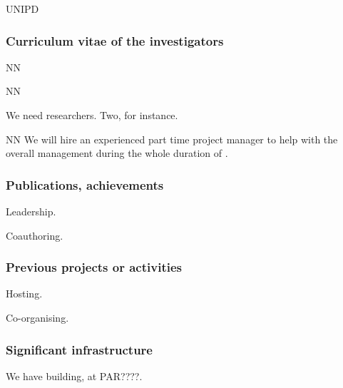 \begin{sitedescription}{UNIPD}
\subsubsection*{Curriculum vitae of the investigators}




\begin{participant}[type=res,PM=48,salary=2500]{NN}
\end{participant}
\begin{participant}[type=res,PM=36,salary=2500]{NN}

We need researchers. Two, for instance.

\end{participant}

\begin{participant}[type=res,PM=24,salary=3932]{NN}
  We will hire an experienced part time project manager to help with
  the overall management during the whole duration of \TheProject.
\end{participant}

\subsubsection*{Publications, achievements}

\begin{compactenum}
\item Leadership.
\item Coauthoring.
\end{compactenum}


\subsubsection*{Previous projects or activities}

\begin{compactenum}
\item Hosting.
\item Co-organising.
\end{compactenum}

\subsubsection*{Significant infrastructure}

We have building, at PAR????.

\end{sitedescription}



